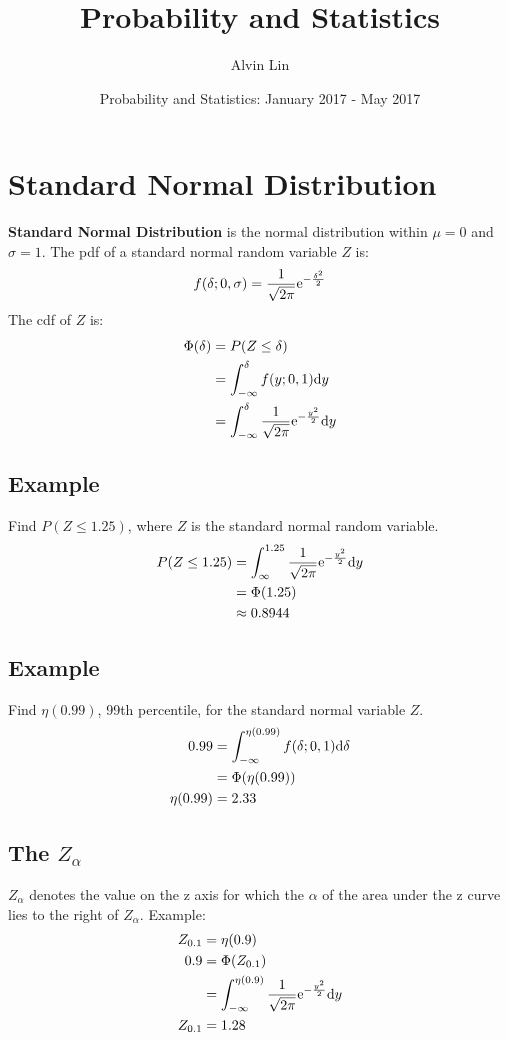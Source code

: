 \documentclass[letterpaper, 12pt]{math}
\title{Probability and Statistics}
\author{Alvin Lin}
\date{Probability and Statistics: January 2017 - May 2017}
\begin{document}
\maketitle

\section*{Standard Normal Distribution}
\textbf{Standard Normal Distribution} is the normal distribution within
\( \mu = 0 \) and \( \sigma = 1 \). The pdf of a standard normal random
variable \( Z \) is:
\[ f(\delta;0,\sigma) = \frac{1}{\sqrt{2\pi}}\mathrm{e}^{-\frac{\delta^{2}}{2}} \]
The cdf of \( Z \) is:
\begin{align*}
  \Phi(\delta) &= P(Z\leq\delta) \\
  &= \int_{-\infty}^{\delta}f(y;0,1)\mathrm{d}{y} \\
  &= \int_{-\infty}^{\delta}\frac{1}{\sqrt{2\pi}}\mathrm{e}^{-\frac{y^{2}}{2}}\mathrm{d}{y}
\end{align*}

\subsection*{Example}
Find \( P(Z\leq 1.25) \), where \( Z \) is the standard normal random variable.
\begin{align*}
  P(Z\leq 1.25) &= \int_{\infty}^{1.25}\frac{1}{\sqrt{2\pi}}
    \mathrm{e}^{-\frac{y^{2}}{2}}\mathrm{d}{y} \\
  &= \Phi(1.25) \\
  &\approx 0.8944
\end{align*}

\subsection*{Example}
Find \( \eta(0.99) \), 99th percentile, for the standard normal variable
\( Z \).
\begin{align*}
  0.99 &= \int_{-\infty}^{\eta(0.99)}f(\delta;0,1)\mathrm{d}{\delta} \\
  &= \Phi(\eta(0.99)) \\
  \eta(0.99) &= 2.33 \\
\end{align*}

\subsection*{The \( Z_{\alpha} \)}
\( Z_{\alpha} \) denotes the value on the z axis for which the \( \alpha \) of
the area under the z curve lies to the right of \( Z_{\alpha} \). Example:
\begin{align*}
  Z_{0.1} &= \eta(0.9) \\
  0.9 &= \Phi(Z_{0.1}) \\
  &= \int_{-\infty}^{\eta(0.9)}\frac{1}{\sqrt{2\pi}}
    \mathrm{e}^{-\frac{y^{2}}{2}}\mathrm{d}{y} \\
  Z_{0.1} &= 1.28
\end{align*}
\end{document}
